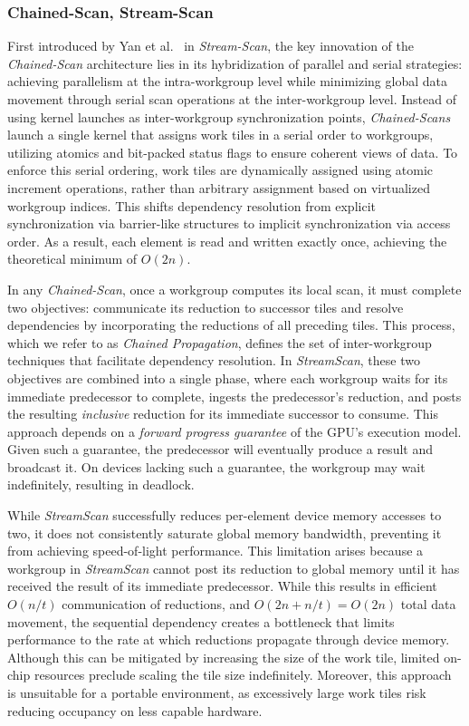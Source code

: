 \documentclass[sigconf]{acmart}
\begin{document}
\subsubsection{Chained-Scan, Stream-Scan}
First introduced by Yan et al.~\cite{10.1145/2442516.2442539} in \emph{Stream-Scan}, the key innovation of the \emph{Chained-Scan} architecture lies in its hybridization of parallel and serial strategies: achieving parallelism at the intra-workgroup level while minimizing global data movement through serial scan operations at the inter-workgroup level. Instead of using kernel launches as inter-workgroup synchronization points, \emph{Chained-Scans} launch a single kernel that assigns work tiles in a serial order to workgroups, utilizing atomics and bit-packed status flags to ensure coherent views of data. To enforce this serial ordering, work tiles are dynamically assigned using atomic increment operations, rather than arbitrary assignment based on virtualized workgroup indices. This shifts dependency resolution from explicit synchronization via barrier-like structures to implicit synchronization via access order. As a result, each element is read and written exactly once, achieving the theoretical minimum of $O(2n)$.

In any \emph{Chained-Scan}, once a workgroup computes its local scan, it must complete two objectives: communicate its reduction to successor tiles and resolve dependencies by incorporating the reductions of all preceding tiles. This process, which we refer to as \emph{Chained Propagation}, defines the set of inter-workgroup techniques that facilitate dependency resolution. In \emph{StreamScan}, these two objectives are combined into a single phase, where each workgroup waits for its immediate predecessor to complete, ingests the predecessor's reduction, and posts the resulting \emph{inclusive} reduction for its immediate successor to consume. This approach depends on a \emph{forward progress guarantee} of the GPU's execution model. Given such a guarantee, the predecessor will eventually produce a result and broadcast it. On devices lacking such a guarantee, the workgroup may wait indefinitely, resulting in deadlock.

While \emph{StreamScan} successfully reduces per-element device memory accesses to two, it does not consistently saturate global memory bandwidth, preventing it from achieving speed-of-light performance. This limitation arises because a workgroup in \emph{StreamScan} cannot post its reduction to global memory until it has received the result of its immediate predecessor. While this results in efficient $O(n/t)$ communication of reductions, and $O(2n+ n/t)= O(2n)$ total data movement, the sequential dependency creates a bottleneck that limits performance to the rate at which reductions propagate through device memory. Although this can be mitigated by increasing the size of the work tile, limited on-chip resources preclude scaling the tile size indefinitely. Moreover, this approach is unsuitable for a portable environment, as excessively large work tiles risk reducing occupancy on less capable hardware.
\end{document}
